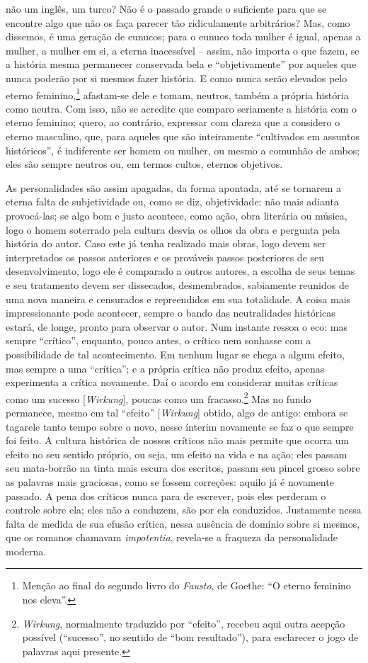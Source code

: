 não um inglês, um turco? Não é o passado grande o suficiente para que se
encontre algo que não os faça parecer tão ridiculamente arbitrários?
Mas, como dissemos, é uma geração de eunucos; para o eunuco toda mulher
é igual, apenas a mulher, a mulher em si, a eterna inacessível -- assim,
não importa o que fazem, se a história mesma permanecer conservada bela
e ``objetivamente'' por aqueles que nunca poderão por si mesmos fazer
história. E como nunca serão elevados pelo eterno feminino,\footnote{Menção
  ao final do segundo livro do \emph{Fausto}, de Goethe: ``O eterno feminino
  nos eleva''.} afastam-se dele e tomam, neutros, também a própria
história como neutra. Com isso, não se acredite que comparo seriamente
a história com o eterno feminino; quero, ao contrário, expressar com
clareza que a considero o eterno masculino, que, para aqueles que são
inteiramente ``cultivados em assuntos históricos'', é indiferente ser
homem ou mulher, ou mesmo a comunhão de ambos; eles são sempre neutros
ou, em termos cultos, eternos objetivos.

As personalidades são assim apagadas, da forma apontada, até se tornarem
a eterna falta de subjetividade ou, como se diz, objetividade: não mais
adianta provocá-las; se algo bom e justo acontece, como ação, obra
literária ou música, logo o homem soterrado pela cultura desvia os olhos
da obra e pergunta pela história do autor. Caso este já tenha realizado
mais obras, logo devem ser interpretados os passos anteriores e os
prováveis passos posteriores de seu desenvolvimento, logo ele é
comparado a outros autores, a escolha de seus temas e seu tratamento
devem ser dissecados, desmembrados, sabiamente reunidos de uma nova
maneira e censurados e repreendidos em sua totalidade. A coisa mais
impressionante pode acontecer, sempre o bando das neutralidades
históricas estará, de longe, pronto para observar o autor. Num instante
ressoa o eco: mas sempre ``crítico'', enquanto, pouco antes, o crítico
nem sonhasse com a possibilidade de tal acontecimento. Em nenhum lugar
se chega a algum efeito, mas sempre a uma ``crítica''; e a própria
crítica não produz efeito, apenas experimenta a crítica novamente. Daí o
acordo em considerar muitas críticas como um sucesso
{[}\emph{Wirkung}{]}, poucas como um fracasso.\footnote{\emph{Wirkung},
  normalmente traduzido por ``efeito'', recebeu aqui outra acepção
  possível (``sucesso'', no sentido de ``bom resultado''), para
  esclarecer o jogo de palavras aqui presente.} Mas no fundo permanece,
mesmo em tal ``efeito'' {[}\emph{Wirkung}{]} obtido, algo de antigo:
embora se tagarele tanto tempo sobre o novo, nesse ínterim novamente se
faz o que sempre foi feito. A cultura histórica de nossos críticos não
mais permite que ocorra um efeito no seu sentido próprio, ou seja, um
efeito na vida e na ação; eles passam seu mata-borrão na tinta mais
escura dos escritos, passam seu pincel grosso sobre as palavras mais
graciosas, como se fossem correções: aquilo já é novamente passado. A
pena dos críticos nunca para de escrever, pois eles perderam o controle
sobre ela; eles não a conduzem, são por ela conduzidos. Justamente nessa
falta de medida de sua efusão crítica, nessa ausência de domínio sobre
si mesmos, que os romanos chamavam \emph{impotentia}, revela-se a
fraqueza da personalidade moderna.


